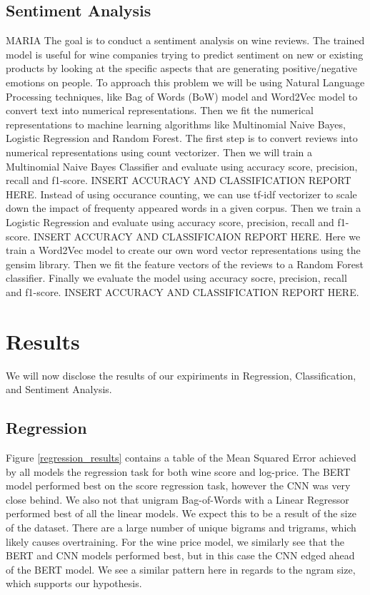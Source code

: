 \documentclass[11pt]{article}
\begin{document}
\subsection{Sentiment Analysis}
    MARIA
    The goal is to conduct a sentiment analysis on wine reviews. The trained model is useful for wine companies trying to predict sentiment on new or existing products by looking at the specific aspects that are generating positive/negative emotions on people.   
    To approach this problem we will be using Natural Language Processing techniques, like Bag of Words (BoW) model and Word2Vec model to convert text into numerical representations. Then we fit the numerical representations to machine learning algorithms like Multinomial Naive Bayes, Logistic Regression and Random Forest. 
    The first step is to convert reviews into numerical representations using count vectorizer. Then we will train a Multinomial Naive Bayes Classifier and evaluate using accuracy score, precision, recall and f1-score. 
    INSERT ACCURACY AND CLASSIFICATION REPORT HERE.
    Instead of using occurance counting, we can use tf-idf vectorizer to scale down the impact of frequenty appeared words in a given corpus. Then we train a Logistic Regression and evaluate using accuracy score, precision, recall and f1-score. 
    INSERT ACCURACY AND CLASSIFICAION REPORT HERE. 
    Here we train a Word2Vec model to create our own word vector representations using the gensim library. Then we fit the feature vectors of the reviews to a Random Forest classifier. Finally we evaluate the model using accuracy socre, precision, recall and f1-score. 
    INSERT ACCURACY AND CLASSIFICATION REPORT HERE. 

\section{Results}
    We will now disclose the results of our expiriments in Regression, Classification, and Sentiment Analysis.

\subsection{Regression}
    Figure \ref{regression_results} contains a table of the Mean Squared Error achieved by all models the regression task for both wine score and log-price. The BERT model performed best on the score regression task, however the CNN was very close behind. We also not that unigram Bag-of-Words with a Linear Regressor performed best of all the linear models. We expect this to be a result of the size of the dataset. There are a large number of unique bigrams and trigrams, which likely causes overtraining. For the wine price model, we similarly see that the BERT and CNN models performed best, but in this case the CNN edged ahead of the BERT model. We see a similar pattern here in regards to the ngram size, which supports our hypothesis.
\end{document}
